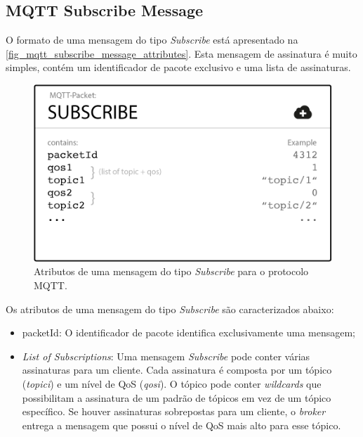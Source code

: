 \subsection{MQTT Subscribe Message}\label{subsection_mqtt_subscribe_message}
O formato de uma mensagem do tipo \textit{Subscribe} está apresentado na \autoref{fig_mqtt_subscribe_message_attributes}. Esta mensagem de assinatura é muito simples, contém um identificador de pacote exclusivo e uma lista de assinaturas.
\begin{figure}[htb]
	\begin{center}
		\caption{Atributos de uma mensagem do tipo \textit{Subscribe} para o protocolo MQTT.}\label{fig_mqtt_subscribe_message_attributes}
		\includegraphics[scale=0.5]{Imagens/mqtt_subscribe_message_attributes.png}
	\end{center}
\end{figure}

Os atributos de uma mensagem do tipo \textit{Subscribe} são caracterizados abaixo:
\begin{itemize}
	\item packetId: O identificador de pacote identifica exclusivamente uma mensagem;
	\item \textit{List of Subscriptions}: Uma mensagem \textit{Subscribe} pode conter várias assinaturas para um cliente. Cada assinatura é composta por um tópico (\textit{topici}) e um nível de QoS (\textit{qosi}). O tópico pode conter \textit{wildcards} que possibilitam a assinatura de um padrão de tópicos em vez de um tópico específico. Se houver assinaturas sobrepostas para um cliente, o \textit{broker} entrega a mensagem que possui o nível de QoS mais alto para esse tópico.
\end{itemize}

